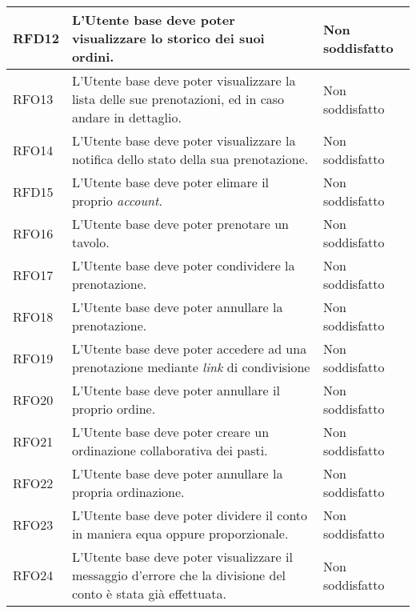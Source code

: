 \begin{longtable}{|l|p{}|p{3cm}|}
	\hline
	RFD12       & L'Utente base deve poter visualizzare lo storico dei suoi ordini.                                                       & Non soddisfatto \\
	\hline
	RFO13       & L'Utente base deve poter visualizzare la lista delle sue prenotazioni, ed in caso andare in dettaglio.                  & Non soddisfatto \\
	\hline
	RFO14       & L'Utente base deve poter visualizzare la notifica dello stato della sua prenotazione.                                   & Non soddisfatto \\
	\hline
	RFD15       & L'Utente base deve poter elimare il proprio \textit{account}.                                                           & Non soddisfatto \\
	\hline
	RFO16       & L'Utente base deve poter prenotare un tavolo.                                                                           & Non soddisfatto \\
	\hline
	RFO17       & L'Utente base deve poter condividere la prenotazione.                                                                   & Non soddisfatto \\
	\hline
	RFO18       & L'Utente base deve poter annullare la prenotazione.                                                                     & Non soddisfatto \\
	\hline
	RFO19       & L'Utente base deve poter accedere ad una prenotazione mediante \textit{link} di condivisione                            & Non soddisfatto \\
	\hline
	RFO20       & L'Utente base deve poter annullare il proprio ordine.                                                                   & Non soddisfatto \\
	\hline
	RFO21       & L'Utente base deve poter creare un ordinazione collaborativa dei pasti.                                                 & Non soddisfatto \\
	\hline
	RFO22       & L'Utente base deve poter annullare la propria ordinazione.                                                              & Non soddisfatto \\
	\hline
	RFO23       & L'Utente base deve poter dividere il conto in maniera equa oppure proporzionale.                                        & Non soddisfatto \\
	\hline
	RFO24       & L'Utente base deve poter visualizzare il messaggio d'errore che la divisione del conto è stata già effettuata.          & Non soddisfatto \\

\end{longtable}
